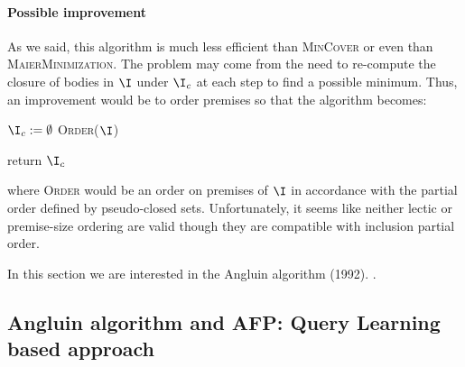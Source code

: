 \begin{figure}[ht]
	
\end{figure}

\paragraph{Possible improvement} As we said, this algorithm is much less 
efficient than \textsc{MinCover} or even than \textsc{MaierMinimization}. The
problem may come from the need to re-compute the closure of bodies in $\I$ under
$\I_c$ at each step to find a possible minimum. Thus, an improvement would be
to order premises so that the algorithm becomes:

\newpage

\begin{algorithm}
	
	\BlankLine
	\BlankLine
	
	$\I_c := \emptyset$ \;
	\textsc{Order}($\I$) \;
	
	\BlankLine
	
	
	return $\I_c$ \;
	
\end{algorithm}

\noindent where \textsc{Order} would be an order on premises of $\I$ in 
accordance with the partial order defined by pseudo-closed sets. Unfortunately,
it seems like neither lectic or premise-size ordering are valid though they 
are compatible with inclusion partial order.

\vspace{1.2em}

In this section we are interested in the Angluin algorithm (1992). 
\cite{angluin_learning_1992, arias_canonical_2009}.

\subsection{Angluin algorithm and AFP: Query Learning based approach}

